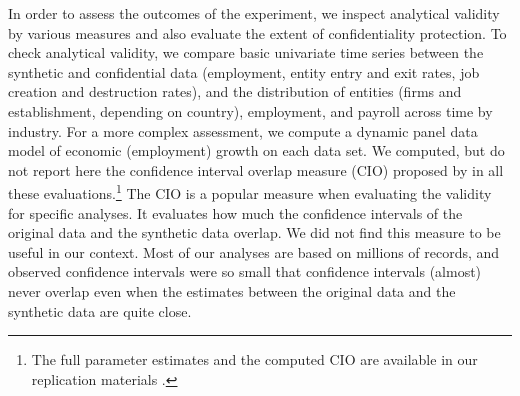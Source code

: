 \documentclass[10pt]{article}
\begin{document}
In order to assess the outcomes of the experiment, we inspect analytical validity by various measures and also evaluate the extent of confidentiality protection. To check analytical validity, we compare basic univariate time series between the synthetic and confidential data (employment, entity entry and exit rates, job creation and destruction rates), and the distribution of entities (firms and establishment, depending on country),  employment, and payroll across time by industry. For a more complex assessment, we compute a dynamic panel data model of economic (employment) growth on each data set. 
We computed, but do not report here the confidence interval overlap measure (CIO) proposed by \citet{tas2006} in all these evaluations.\footnote{The full parameter estimates and the computed CIO are available in our replication materials \parencite{SIT-paper-repo}.}
The CIO is a popular measure when evaluating the validity for specific analyses. It evaluates how much the confidence intervals of the original data and the synthetic data overlap. We did not find this measure to be useful in our context. Most of our analyses are based on millions of records, and observed confidence intervals were so small that confidence intervals (almost) never overlap even when the estimates between the original data and the synthetic data are quite close. 
\end{document}
